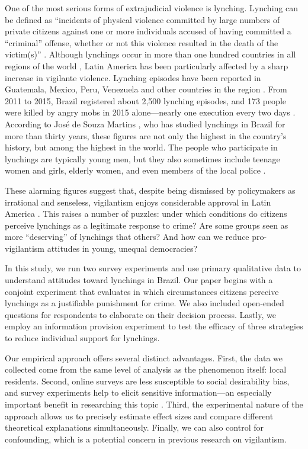 \documentclass[12pt,a4paper]{article}
\begin{document}
One of the most serious forms of extrajudicial violence is lynching. Lynching
can be defined as ``incidents of physical violence committed by large numbers
of private citizens against one or more individuals accused of having committed
a ``criminal'' offense, whether or not this violence resulted in the death of
the victim(s)'' \citep[645]{godoy2004justice}. Although lynchings occur in more
than one hundred countries in all regions of the world
\citep{jung2020lynching,smith2019contradictions}, Latin America has been
particularly affected by a sharp increase in vigilante violence. Lynching
episodes have been reported in Guatemala, Mexico, Peru, Venezuela and other
countries in the region \citep{barbara2015vigilantes, cruz2019determinants,
godoy2004justice}. From 2011 to 2015, Brazil registered about 2,500 lynching
episodes, and 173 people were killed by angry mobs in 2015 alone---nearly one
execution every two days \citep{barbara2015vigilantes, oliveira2016mob}.
According to José de Souza Martins \citeyearpar{martins2015linchamentos}, who
has studied lynchings in Brazil for more than thirty years, these figures are
not only the highest in the country's history, but among the highest in the
world. The people who participate in lynchings are typically young men, but
they also sometimes include teenage women and girls, elderly women, and even
members of the local police \citep{moura2017linchamentos}.

These alarming figures suggest that, despite being dismissed by policymakers as
irrational and senseless, vigilantism enjoys considerable approval in Latin
America \citep{berg2011globalizing, goldstein2005flexible}. This raises a
number of puzzles: under which conditions do citizens perceive lynchings as a
legitimate response to crime? Are some groups seen as more ``deserving'' of
lynchings that others? And how can we reduce pro-vigilantism attitudes in
young, unequal democracies?

In this study, we run two survey experiments and use primary qualitative data
to understand attitudes toward lynchings in Brazil. Our paper begins with a
conjoint experiment that evaluates in which circumstances citizens perceive
lynchings as a justifiable punishment for crime. We also included open-ended
questions for respondents to elaborate on their decision process. Lastly, we
employ an information provision experiment to test the efficacy of three
strategies to reduce individual support for lynchings.

Our empirical approach offers several distinct advantages. First, the data we
collected come from the same level of analysis as the phenomenon itself: local
residents. Second, online surveys are less susceptible to social desirability
bias, and survey experiments help to elicit sensitive information---an
especially important benefit in researching this topic
\citep{horiuchi2022does}. Third, the experimental nature of the approach allows
us to precisely estimate effect sizes and compare different theoretical
explanations simultaneously. Finally, we can also control for confounding,
which is a potential concern in previous research on vigilantism.
\end{document}
